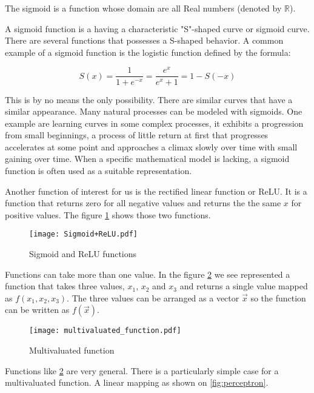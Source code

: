 \documentclass[10pt]{book}
\begin{document}
The sigmoid is a function whose domain are all Real numbers (denoted by $\mathbb{R}$). 

A sigmoid function is a having a characteristic "S"-shaped curve or sigmoid curve.  
There are several functions that possesses a S-shaped behavior. 
A common example of a sigmoid function is the logistic function defined by the formula:

$$S(x) = \frac{1}{1 + e^{-x}} = \frac{e^x}{e^x + 1}=1-S(-x)$$

This is by no means the only possibility. There are similar curves that have a similar appearance.
Many natural processes can be modeled with sigmoids.
One example are learning curves in some complex processes, it exhibits a progression from small beginnings, a process of little return at first that progresses accelerates at some point and approaches a climax slowly over time with small gaining over time. When a specific mathematical model is lacking, a sigmoid function is often used as a suitable representation.

Another function of interest for us is the rectified linear function or ReLU.
It is a function that returns zero for all negative values and returns the the same $x$ for positive values. 
The figure \ref{fig:sigmoid_relu} shows those two functions.

\begin{center}
\begin{figure}
\texttt{[image: Sigmoid+ReLU.pdf]}
\caption{Sigmoid and ReLU functions}
\label{fig:sigmoid_relu}
\end{figure}
\end{center}

Functions can take more than one value.
In the figure \ref{fig:multivaluated} we see represented a function that takes three values, $x_1$, $x_2$ and $x_3$ and returns a single value mapped as $f(x_1,x_2, x_3)$.
The three values can be arranged as a vector $\vec{x}$ so the function can be written as $f(\vec{x})$.

\begin{center}
\begin{figure}
\texttt{[image: multivaluated\_function.pdf]}
\caption{Multivaluated function}
\label{fig:multivaluated}
\end{figure}
\end{center}

Functions like \ref{fig:multivaluated} are very general. 
There is a particularly simple case for a multivaluated function. 
A linear mapping as shown on \ref{fig:perceptron}. 
\end{document}
